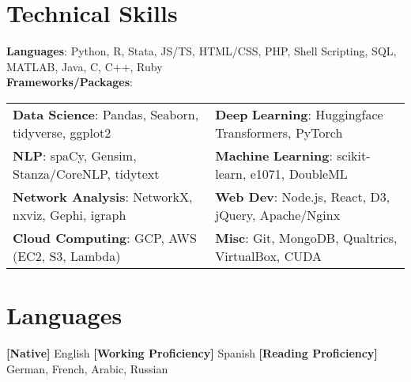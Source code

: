 \documentclass[letterpaper,11pt]{article}
\newcommand{\skfill}{\hfill}
\newcommand{\rpkg}[1]{#1}
\begin{document}
\begin{minipage}{\textwidth}
\section{Technical Skills}

\textbf{Languages}: Python, R, Stata, JS/TS, HTML/CSS, PHP, Shell Scripting, SQL, MATLAB, Java, C, C++, Ruby\vspace{2mm}\\

\textbf{Frameworks/Packages}:\vspace{1mm}
\setlength{}
\noindent\begin{tabularx}{\textwidth}{@{}bb@{}}
	\textbf{Data Science}: \skfill Pandas, \skfill Seaborn, \skfill \rpkg{tidyverse}, \skfill \rpkg{ggplot2} & \textbf{Deep} \textbf{Learning}: \skfill Huggingface Transformers, \skfill PyTorch\vspace{0.5mm}\\
	\textbf{NLP}: \skfill spaCy, \skfill Gensim, \skfill Stanza/CoreNLP, \skfill \rpkg{tidytext} & \textbf{Machine} \textbf{Learning}: \skfill scikit-learn, \skfill \rpkg{e1071}, \skfill DoubleML\vspace{0.5mm}\\
	\textbf{Network Analysis}: \skfill NetworkX, \skfill nxviz, \skfill Gephi, \skfill \rpkg{igraph} & \textbf{Web Dev}: \skfill Node.js, \skfill React, \skfill D3, \skfill jQuery, \skfill Apache/Nginx\vspace{0.5mm}\\
	\textbf{Cloud Computing}: GCP, \skfill AWS (EC2, S3, Lambda) & \textbf{Misc}: \skfill Git, \skfill MongoDB, \skfill Qualtrics, \skfill VirtualBox, \hfill CUDA \\
\end{tabularx}


\section{Languages}

\textbf{[Native]} English \textbf{[Working Proficiency]} Spanish \textbf{[Reading Proficiency]} German, French, Arabic, Russian


\end{minipage}
\end{document}
